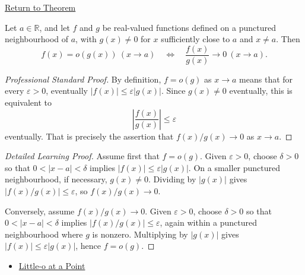 \newpage
{}
\label{prf:little-o-quotient-characterization}

\begin{remark*}[Return]
\hyperref[prop:little-o-quotient-characterization]{Return to Theorem}
\end{remark*}

\begin{proposition*}
Let $a\in\mathbb{R}$, and let $f$ and $g$ be real-valued functions defined on a
punctured neighbourhood of $a$, with $g(x)\neq 0$ for $x$ sufficiently close to
$a$ and $x\neq a$. Then
\[
  f(x)=o(g(x))\ (x\to a)
  \quad\Longleftrightarrow\quad
  \frac{f(x)}{g(x)}\to 0\ (x\to a).
\]
\end{proposition*}

\begin{proof}[Professional Standard Proof]
\LRAProofBodyStart
By definition, $f=o(g)$ as $x\to a$ means that for every $\varepsilon>0$,
eventually $|f(x)|\leq\varepsilon |g(x)|$. Since $g(x)\neq 0$ eventually, this
is equivalent to
\[
  \left|\frac{f(x)}{g(x)}\right|\leq\varepsilon
\]
eventually. That is precisely the assertion that $f(x)/g(x)\to 0$ as $x\to a$.
\end{proof}

\begin{proof}[Detailed Learning Proof]
\LRAProofBodyStart
Assume first that $f=o(g)$. Given $\varepsilon>0$, choose $\delta>0$ so that
$0<|x-a|<\delta$ implies $|f(x)|\leq\varepsilon |g(x)|$. On a smaller punctured
neighbourhood, if necessary, $g(x)\neq 0$. Dividing by $|g(x)|$ gives
$|f(x)/g(x)|\leq\varepsilon$, so $f(x)/g(x)\to 0$.

Conversely, assume $f(x)/g(x)\to 0$. Given $\varepsilon>0$, choose $\delta>0$
so that $0<|x-a|<\delta$ implies $|f(x)/g(x)|\leq\varepsilon$, again within a
punctured neighbourhood where $g$ is nonzero. Multiplying by $|g(x)|$ gives
$|f(x)|\leq\varepsilon |g(x)|$, hence $f=o(g)$.
\end{proof}

\begin{dependencies}
\begin{itemize}
  \item \hyperref[def:little-o-at-a-point]{Little-o at a Point}
\end{itemize}
\end{dependencies}

\clearpage
